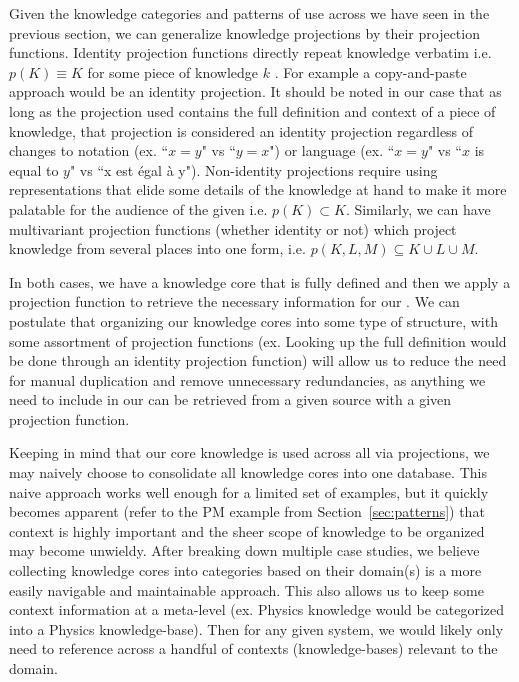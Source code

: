 Given the knowledge categories and patterns of use across \sfs{} we have seen 
in the previous section, we can generalize knowledge projections by their 
projection functions.  Identity 
projection functions directly repeat knowledge 
verbatim i.e. $p(K) \equiv K$ for some piece of knowledge $k$ . For example a 
copy-and-paste approach would be an identity projection.  It should be noted in 
our case that as long as the projection used contains the full definition and 
context of a piece of knowledge, that projection is considered an identity 
projection regardless of changes to notation (ex. ``$x = y$" vs ``$y = x$") or 
language (ex. ``$x = y$" vs ``$x$ is equal to $y$" vs ``x est \'egal \`a y"). 
Non-identity projections require using representations that elide some details 
of the knowledge at hand to make it more palatable for the audience of the 
given \sf{} i.e. $p(K) \subset K$. Similarly, we can have multivariant 
projection functions (whether identity or not) which project knowledge from 
several places into one form, i.e. $p(K,L,M) \subseteq K\cup L\cup M$.

In both cases, we have a knowledge core that is fully defined and then we apply 
a projection function to retrieve the necessary information for our \sf{}. We 
can postulate that organizing our knowledge cores into some type of structure, 
with some assortment of projection functions (ex. Looking up the full 
definition would be done through an identity projection function) will allow 
us to reduce the need for manual duplication and remove unnecessary 
redundancies, as anything we need to include in our \sfs{} can be retrieved 
from a given source with a given projection function.

Keeping in mind that our core knowledge is used across all \sfs{} via 
projections, we may naively choose to consolidate all knowledge cores into one 
database. This naive approach works well enough for a limited set of examples, 
but it quickly becomes apparent (refer to the PM example from 
Section~\ref{sec:patterns}) that context is highly important and the sheer 
scope of knowledge to be organized may become unwieldy. After breaking down 
multiple case studies, we believe collecting knowledge cores into categories 
based on their domain(s) is a more easily navigable and maintainable approach. 
This also allows us to keep some context information at a meta-level (ex. 
Physics knowledge would be categorized into a Physics knowledge-base). Then for 
any given system, we would likely only need to reference across a handful of 
contexts (knowledge-bases) relevant to the domain.

